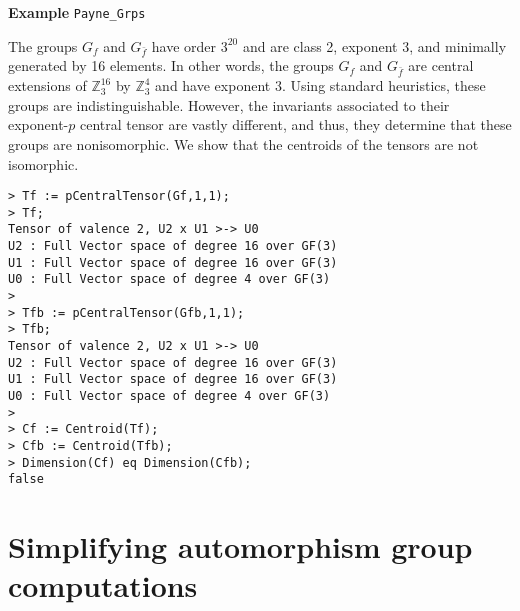 \begin{framed} {\bf Example} {\tt Payne\_Grps}
{The groups $G_f$ and $G_{\bar{f}}$ have order $3^{20}$ and are class 2, exponent 3, and minimally generated by 16 elements.
In other words, the groups $G_f$ and $G_{\bar{f}}$ are central extensions of $\mathbb{Z}_3^{16}$ by $\mathbb{Z}_3^{4}$ and have exponent $3$.
Using standard heuristics, these groups are indistinguishable.
However, the invariants associated to their exponent-$p$ central tensor are vastly different, 
and thus, they determine that these groups are nonisomorphic. 
We show that the centroids of the tensors are not isomorphic.
\begin{lstlisting}[frame=single,basicstyle=\ttfamily\color{black!30!
teal},backgroundcolor=\color{white!70!gray}]
> Tf := pCentralTensor(Gf,1,1);
> Tf;
Tensor of valence 2, U2 x U1 >-> U0
U2 : Full Vector space of degree 16 over GF(3)
U1 : Full Vector space of degree 16 over GF(3)
U0 : Full Vector space of degree 4 over GF(3)
> 
> Tfb := pCentralTensor(Gfb,1,1);
> Tfb;
Tensor of valence 2, U2 x U1 >-> U0
U2 : Full Vector space of degree 16 over GF(3)
U1 : Full Vector space of degree 16 over GF(3)
U0 : Full Vector space of degree 4 over GF(3)
> 
> Cf := Centroid(Tf);
> Cfb := Centroid(Tfb);
> Dimension(Cf) eq Dimension(Cfb);
false
\end{lstlisting}
}
\end{framed}

\section{Simplifying automorphism group computations}~


